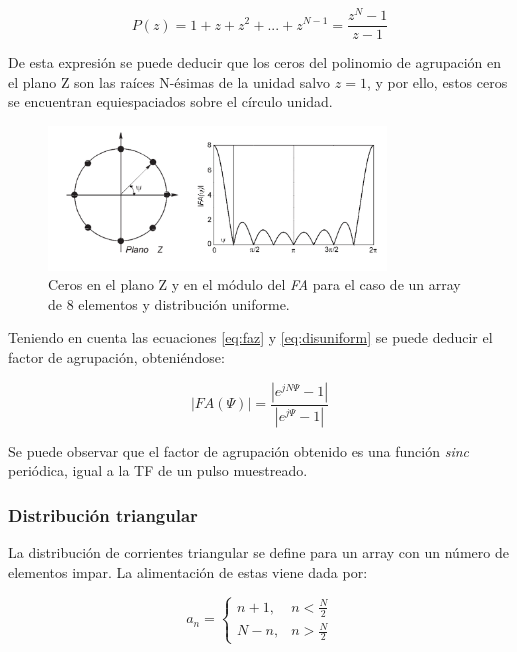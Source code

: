 \begin{equation}
	P(z)=1+z+z^{2}+...+z^{N-1}=\frac{z^{N}-1}{z-1}
	\label{eq:disuniform}
\end{equation}

\par De esta expresión se puede deducir que los ceros del polinomio de agrupación en el plano Z son las raíces N-ésimas de la unidad salvo $z=1$, y por ello, estos ceros se encuentran equiespaciados sobre el círculo unidad. 

\begin{figure}[h]
    \centering
        \includegraphics[width=0.8\textwidth]{archivos/array/uniforme}
        \caption{Ceros en el plano Z y en el módulo del \textit{FA} para el caso de un array de 8 elementos y distribución uniforme. \citep{Cardama2002}}
        \label{fig:cerosuniforme}
\end{figure}

\par Teniendo en cuenta las ecuaciones \ref{eq:faz} y \ref{eq:disuniform} se puede deducir el factor de agrupación, obteniéndose: 

\begin{equation}
	\left | FA (\Psi) \right |=\frac{\left | e^{jN\Psi}-1 \right |}{\left | e^{j\Psi}-1 \right |}
	\label{eq:casisinc}
\end{equation}

\par Se puede observar que el factor de agrupación obtenido es una función \textit{sinc} periódica, igual a la TF de un pulso muestreado. 

\subsubsection{Distribución triangular} 
\par La distribución de corrientes triangular se define para un array con un número de elementos impar. La alimentación de estas viene dada por: 

\begin{equation}
	a_{n}=\begin{cases} n+1, &  n< \frac{N}{2} \\ N-n, & n> \frac{N}{2} \end{cases}
	\label{eq:casotriang}
\end{equation}

